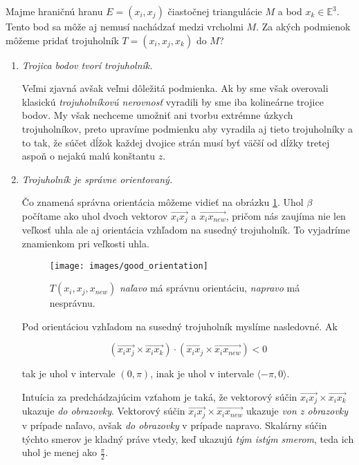 Majme hraničnú hranu $E=(x_i, x_j)$ čiastočnej triangulácie $M$ a bod $x_k \in \mathbb{E}^3$. 
Tento bod sa môže aj nemusí nachádzať medzi vrcholmi $M$. Za akých podmienok môžeme pridať trojuholník 
$T=(x_i, x_j, x_k)$ do $M$?

\begin{enumerate}
    \item{
        \textit{Trojica bodov tvorí trojuholník.}


        Veľmi zjavná avšak veľmi dôležitá podmienka. Ak by sme však overovali klasickú 
        \textit{trojuholníkovú nerovnosť} vyradili by sme iba kolineárne trojice bodov. My však nechceme 
        umožniť ani tvorbu extrémne úzkych trojuholníkov, preto upravíme podmienku aby vyradila aj tieto
        trojuholníky a to tak, že súčet dĺžok každej dvojice strán musí byť väčší od dĺžky tretej aspoň
        o nejakú malú konštantu $z$.
    } 

    \item{
        \textit{Trojuholník je správne orientovaný.}


        Čo znamená správna orientácia môžeme vidieť na obrázku \ref{obr:good_orientation}. Uhol $\beta$
        počítame ako uhol dvoch vektorov $\overrightarrow{x_i x_j}$ a $\overrightarrow{x_i x_{new}}$, 
        pričom nás zaujíma nie len veľkosť uhla ale aj orientácia vzhľadom na susedný trojuholník. To 
        vyjadríme znamienkom pri veľkosti uhla. 

        \begin{figure}
            \centerline{\texttt{[image: images/good\_orientation]}}
            \caption[]{$T(x_i, x_j, x_{new})$ \textit{naľavo} má správnu orientáciu, \textit{napravo} má nesprávnu.}
            \label{obr:good_orientation}
        \end{figure}

        Pod orientáciou vzhľadom na susedný trojuholník myslíme nasledovné.
        Ak

        $$(\overrightarrow{x_i x_j} \times \overrightarrow{x_i x_k}) 
        \cdot (\overrightarrow{x_i x_j} \times \overrightarrow{x_i x_{new}}) < 0$$

        tak je uhol v intervale $(0, \pi)$, inak je uhol v intervale $ \langle -\pi, 0 \rangle$.
        
        Intuícia za predchádzajúcim vzťahom je taká, že vektorový súčin 
        $\overrightarrow{x_i x_j} \times \overrightarrow{x_i x_k}$ ukazuje \textit{do obrazovky}.
        Vektorový súčin $\overrightarrow{x_i x_j} \times \overrightarrow{x_i x_{new}}$ ukazuje 
        \textit{von z obrazovky} v prípade naľavo, avšak \textit{do obrazovky} v prípade napravo.
        Skalárny súčin týchto smerov je kladný práve vtedy, keď ukazujú \textit{tým istým smerom}, 
        teda ich uhol je menej ako $\frac{\pi}{2}$. 
        
}
\end{enumerate}
